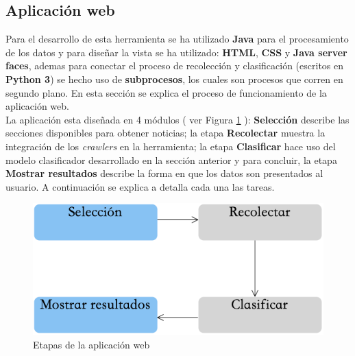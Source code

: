 \subsection{Aplicación web}

Para el desarrollo de esta  herramienta se ha utilizado \textbf{Java} para el procesamiento de los datos y para diseñar la vista se ha utilizado: \textbf{HTML}, \textbf{CSS} y \textbf{Java server faces}, ademas para conectar el proceso de recolección y clasificación (escritos en \textbf{Python 3}) se hecho uso de \textbf{subprocesos}, los cuales son procesos que corren en segundo plano. En esta sección se explica el proceso de funcionamiento de la aplicación web.\\

La aplicación esta diseñada en 4 módulos ( ver Figura \ref{fig:procesoAppWeb} ): \textbf{Selección} describe las secciones disponibles para obtener noticias; la etapa \textbf{Recolectar} muestra la integración de los \textit{crawlers} en la herramienta; la etapa \textbf{Clasificar} hace uso del modelo clasificador desarrollado en la sección anterior y para concluir, la etapa \textbf{Mostrar resultados} describe la forma en que los datos son presentados al usuario. A continuación se explica a detalla cada una las tareas.


\begin{figure}[h]
	\centering
	\includegraphics[scale=0.35]{imagenes/Aplicacion/Proceso.png}
	\caption{Etapas de la aplicación web}
	\label{fig:procesoAppWeb}
\end{figure}

